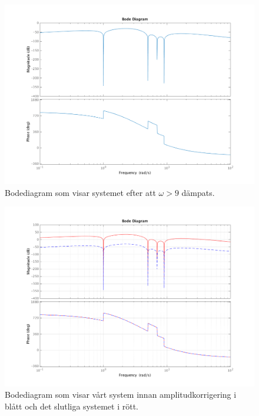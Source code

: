 \begin{figure}
    \label{fig:task4b-bode}
    \caption{Bodediagram som visar systemet efter att $\omega > 9$ dämpats.}
    \centering
    \includegraphics[scale=0.55]{figures/task4b-bode.png}
\end{figure}

\begin{figure}
    \label{fig:task4d-bode}
    \caption{Bodediagram som visar vårt system innan amplitudkorrigering i
    blått och det slutliga systemet i rött.}
    \centering
    \includegraphics[scale=0.55]{figures/task4d-bode.png}
\end{figure}

